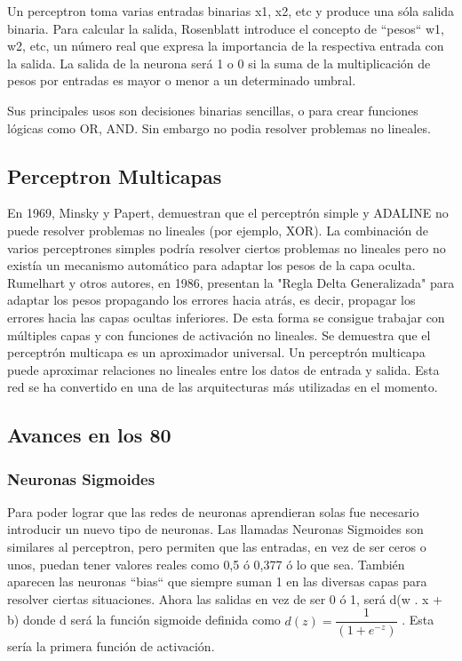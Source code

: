 \documentclass[a4paper]{article}
\begin{document}
Un perceptron toma varias entradas binarias x1, x2, etc y produce una sóla salida binaria. Para calcular la salida, Rosenblatt introduce el concepto de ``pesos`` w1, w2, etc, un número real que expresa la importancia de la respectiva entrada con la salida. La salida de la neurona será 1 o 0 si la suma de la multiplicación de pesos por entradas es mayor o menor a un determinado umbral.

Sus principales usos son decisiones binarias sencillas, o para crear funciones lógicas como OR, AND. Sin embargo no podia resolver problemas no lineales.


\subsection{Perceptron Multicapas}

En 1969, Minsky y Papert, demuestran que el perceptrón simple y ADALINE no puede resolver problemas no lineales (por ejemplo, XOR). La combinación de varios perceptrones simples podría resolver ciertos problemas no lineales pero no existía un mecanismo automático para adaptar los pesos de la capa oculta. Rumelhart y otros autores, en 1986, presentan la "Regla Delta Generalizada" para adaptar los pesos propagando los errores hacia atrás, es decir, propagar los errores hacia las capas ocultas inferiores. De esta forma se consigue trabajar con múltiples capas y con funciones de activación no lineales. Se demuestra que el perceptrón multicapa es un aproximador universal. Un perceptrón multicapa puede aproximar relaciones no lineales entre los datos de entrada y salida. Esta red se ha convertido en una de las arquitecturas más utilizadas en el momento.

\subsection{Avances en los 80}

\subsubsection{Neuronas Sigmoides}

Para poder lograr que las redes de neuronas aprendieran solas fue necesario introducir un nuevo tipo de neuronas. Las llamadas Neuronas Sigmoides son similares al perceptron, pero permiten que las entradas, en vez de ser ceros o unos, puedan tener valores reales como 0,5 ó 0,377 ó lo que sea. También aparecen las neuronas ``bias`` que siempre suman 1 en las diversas capas para resolver ciertas situaciones. Ahora las salidas en vez de ser 0 ó 1, será d(w . x + b) donde d será la función sigmoide definida como $d(z) = \dfrac{1}{( 1 +e^{-z})}$ . Esta sería la primera función de activación.
\end{document}
